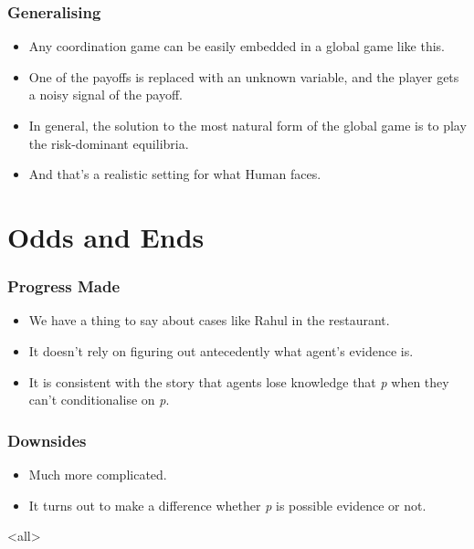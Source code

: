 \begin{frame}

\frametitle{Generalising}
\label{generalising}

\begin{itemize}
\item Any coordination game can be easily embedded in a global game like this.

\item One of the payoffs is replaced with an unknown variable, and the player gets a noisy signal of the payoff.

\item In general, the solution to the most natural form of the global game is to play the risk-dominant equilibria.

\item And that's a realistic setting for what Human faces.

\end{itemize}
\end{frame}

\section{Odds and Ends}
\label{oddsandends}

\begin{frame}

\frametitle{Progress Made}
\label{progressmade}

\begin{itemize}
\item We have a thing to say about cases like Rahul in the restaurant.

\item It doesn't rely on figuring out antecedently what agent's evidence is.

\item It is consistent with the story that agents lose knowledge that \emph{p} when they can't conditionalise on \emph{p}.

\end{itemize}
\end{frame}

\begin{frame}

\frametitle{Downsides}
\label{downsides}

\begin{itemize}
\item Much more complicated.

\item It turns out to make a difference whether \emph{p} is possible evidence or not.

\end{itemize}
\end{frame}

\mode<all>


\mode*
